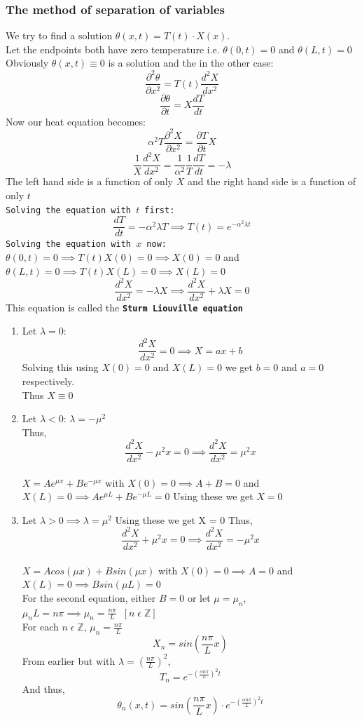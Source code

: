 \documentclass[11pt]{article}
\theoremstyle{definition}
\newcommand{\Z}{\mathbb{Z}}
\newcommand{\pd}{{\partial}}
\newcommand*{\ddo}[2]{\frac{d{#1}}{d{#2}}}%
\newcommand*{\dt}[2]{\frac{d^2{#1}}{d{#2}^2}}
\newcommand*{\pdo}[2]{\frac{\pd{#1}}{\pd{#2}}}%
\newcommand*{\pdt}[2]{\frac{\pd^2{#1}}{\pd{#2}^2}}
\begin{document}
\subsubsection{The method of separation of variables}
We try to find a solution $\theta(x,t) = T(t)\cdot X(x)$. \\Let the endpoints both have zero temperature i.e. $\theta(0,t) = 0$ and $\theta(L,t) = 0$\\
Obviously $\theta(x,t) \equiv 0$ is a solution and the in the other case:
$$\pdt{\theta}{x} = T(t)\dt{X}{x}$$
$$\pdo{\theta}{t} = X\ddo{T}{t}$$
Now our heat equation becomes:
$$\alpha^2 T\pdt{X}{x} = \pdo{T}{t}X$$
$$\frac{1}{X}\dt{X}{x} = \frac{1}{\alpha^2}\frac{1}{T}\ddo{T}{t} = -\lambda$$
The left hand side is a function of only $X$ and the right hand side is a function of only $t$\\
\texttt{Solving the equation with $t$ first:}\\
$$\ddo{T}{t} = -\alpha^2 \lambda T \implies T(t) =  e^{-\alpha^2 \lambda t}$$
\texttt{Solving the equation with $x$ now:}\\
$\theta(0, t) = 0 \implies T(t)X(0) = 0 \implies X(0) = 0$ and
$\theta(L, t) = 0 \implies T(t)X(L) = 0 \implies X(L) = 0$
$$\dt{X}{x} = -\lambda X \implies \dt{X}{x} + \lambda X = 0$$
This equation is called the \textbf{\texttt{Sturm Liouville equation}}\\
\begin{enumerate}
    \item Let $\lambda = 0$:
    $$\dt{X}{x} = 0 \implies X = ax + b$$
    Solving this using $X(0) = 0 $ and $X(L) = 0$ we get $b = 0$ and $a = 0$ respectively.\\
    Thus $X \equiv 0$
    \item Let $\lambda < 0$:
    $\lambda = -\mu^2$\\
    Thus,
    $$\dt{X}{x} -\mu^2x = 0 \implies \dt{X}{x} = \mu^2x$$\\
    $X = Ae^{\mu x} + Be^{-\mu x}$ with $X(0) = 0 \implies A + B = 0$ and $X(L) = 0 \implies Ae^{\mu L} + Be^{-\mu L} = 0$
    Using these we get $X = 0$
    \item Let $\lambda > 0 \implies \lambda = \mu^2$
    Using these we get X = 0
     Thus,
    $$\dt{X}{x} +\mu^2x = 0 \implies \dt{X}{x} = -\mu^2x$$\\
    $X = Acos(\mu x) + Bsin(\mu x)$ with $X(0) = 0 \implies A = 0$ and\\ $X(L) = 0 \implies Bsin(\mu L) = 0$\\
    For the second equation, either $B = 0$ or
    let $\mu = \mu_n$, $\mu_n L = n\pi \implies \mu_n = \frac{n\pi}{L} \;\; [n\; \epsilon\; \Z]$\\
    For each $n\; \epsilon\; \Z$, $\mu_n = \frac{n\pi}{L}$
    $$X_n = sin(\frac{n\pi}{L}x)$$
    From earlier but with $\lambda = (\frac{n\pi}{L})^2$,
    $$T_n = e^{-(\frac{\alpha n\pi}{L})^2t}$$
    And thus,
    $$\theta_n(x,t) = sin(\frac{n\pi}{L}x) \cdot e^{-(\frac{\alpha n\pi}{L})^2t}$$
\end{enumerate}
\end{document}
